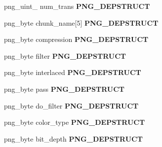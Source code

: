 \begin{DoxyCompactItemize}
\item 
\hypertarget{structpng__struct__def_adffd20cdb7e6d66cf9df133cc5fce422}{png\-\_\-uint\-\_ num\-\_\-trans {\bfseries P\-N\-G\-\_\-\-D\-E\-P\-S\-T\-R\-U\-C\-T}}\label{structpng__struct__def_adffd20cdb7e6d66cf9df133cc5fce422}

\item 
\hypertarget{structpng__struct__def_ab9b72aba69403b54093bfad1374b9433}{png\-\_\-byte chunk\-\_\-name\mbox{[}5\mbox{]} {\bfseries P\-N\-G\-\_\-\-D\-E\-P\-S\-T\-R\-U\-C\-T}}\label{structpng__struct__def_ab9b72aba69403b54093bfad1374b9433}

\item 
\hypertarget{structpng__struct__def_a7b2fbacd827608073bd2dba311c83264}{png\-\_\-byte compression {\bfseries P\-N\-G\-\_\-\-D\-E\-P\-S\-T\-R\-U\-C\-T}}\label{structpng__struct__def_a7b2fbacd827608073bd2dba311c83264}

\item 
\hypertarget{structpng__struct__def_a4eaae041dd2f55d98f3fe322d6ba73a6}{png\-\_\-byte filter {\bfseries P\-N\-G\-\_\-\-D\-E\-P\-S\-T\-R\-U\-C\-T}}\label{structpng__struct__def_a4eaae041dd2f55d98f3fe322d6ba73a6}

\item 
\hypertarget{structpng__struct__def_a8ea29dd2b85d2f1e23fb7800188ab71a}{png\-\_\-byte interlaced {\bfseries P\-N\-G\-\_\-\-D\-E\-P\-S\-T\-R\-U\-C\-T}}\label{structpng__struct__def_a8ea29dd2b85d2f1e23fb7800188ab71a}

\item 
\hypertarget{structpng__struct__def_a95bf092b34ba1f3c6b2942a55b296e86}{png\-\_\-byte pass {\bfseries P\-N\-G\-\_\-\-D\-E\-P\-S\-T\-R\-U\-C\-T}}\label{structpng__struct__def_a95bf092b34ba1f3c6b2942a55b296e86}

\item 
\hypertarget{structpng__struct__def_a24711a80f877c416ca001447834849a5}{png\-\_\-byte do\-\_\-filter {\bfseries P\-N\-G\-\_\-\-D\-E\-P\-S\-T\-R\-U\-C\-T}}\label{structpng__struct__def_a24711a80f877c416ca001447834849a5}

\item 
\hypertarget{structpng__struct__def_a9a62118608ad646bef4859cbe3bb2c41}{png\-\_\-byte color\-\_\-type {\bfseries P\-N\-G\-\_\-\-D\-E\-P\-S\-T\-R\-U\-C\-T}}\label{structpng__struct__def_a9a62118608ad646bef4859cbe3bb2c41}

\item 
\hypertarget{structpng__struct__def_a011a5934e2a73cdf4282b092ec58e226}{png\-\_\-byte bit\-\_\-depth {\bfseries P\-N\-G\-\_\-\-D\-E\-P\-S\-T\-R\-U\-C\-T}}\label{structpng__struct__def_a011a5934e2a73cdf4282b092ec58e226}


\end{DoxyCompactItemize}
